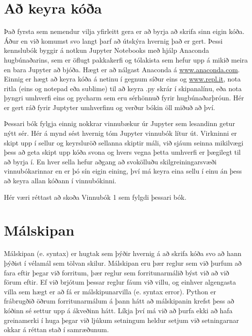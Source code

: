 \documentclass[11pt,fleqn]{book} %
\begin{document}

\section{Að keyra kóða}

Það fyrsta sem nemendur vilja yfirleitt gera er að byrja að skrifa sinn eigin kóða. 
Áður en við komumst svo langt þarf að útskýra hvernig það er gert. 
Þessi kennslubók byggir á notkun Jupyter Notebooks með hjálp Anaconda hugbúnaðarins, sem er öflugt pakkakerfi og tólakista sem hefur upp á mikið meira en bara Jupyter að bjóða. 
Hægt er að nálgast Anaconda á \href{www.anaconda.com}{www.anaconda.com}. Einnig er hægt að keyra kóða á netinu í gegnum síður eins og \href{www.repl.it}{www.repl.it}, nota ritla (eins og notepad eða sublime) til að keyra .py skrár í skipanalínu, eða nota þyngri umhverfi eins og pycharm sem eru sérhönnuð fyrir hugbúnaðarþróun. 
Hér er gert ráð fyrir Juptyter umhverfinu og verður bókin öll miðuð að því.

Þessari bók fylgja einnig nokkrar vinnubækur úr Jupyter sem lesandinn getur nýtt sér. 
Hér á mynd  sést hvernig tóm Jupyter vinnubók lítur út. 
Virkninni er skipt upp í sellur og keyrsluröð sellanna skiptir máli, við sjáum seinna mikilvægi þess að geta skipt upp kóða svona og hvers vegna þetta umhverfi er þægilegt til að byrja í. 
En hver sella hefur aðgang að svokölluðu skilgreiningarsvæði vinnubókarinnar en er þó sín eigin eining, því má keyra eina sellu í einu án þess að keyra allan kóðann í vinnubókinni.

Hér væri réttast að skoða Vinnubók 1 sem fylgdi þessari bók. 




\section{Málskipan}

Málskipan (e. syntax) er hugtak sem þýðir hvernig á að skrifa kóða svo að hann þýðist í vélamál sem tölvan skilur. 
Málskipan eru þær reglur sem við þurfum að fara eftir þegar við forritum, þær reglur sem forritunarmálið býst við að við förum eftir. 
Ef við brjótum þessar reglur fáum við villu, og einhver algengasta villa sem hægt er að fá er málskipunarvilla (e. syntax error). 
Python er frábrugðið öðrum forritunarmálum á þann hátt að málskipanin krefst þess að kóðinn sé settur upp á ákveðinn hátt. 
Líkja því má við að þurfa ekki að hafa greinamerki í huga þegar við ljúkum setningum heldur setjum við setningarnar okkar á réttan stað í samræðunum.
\end{document}
